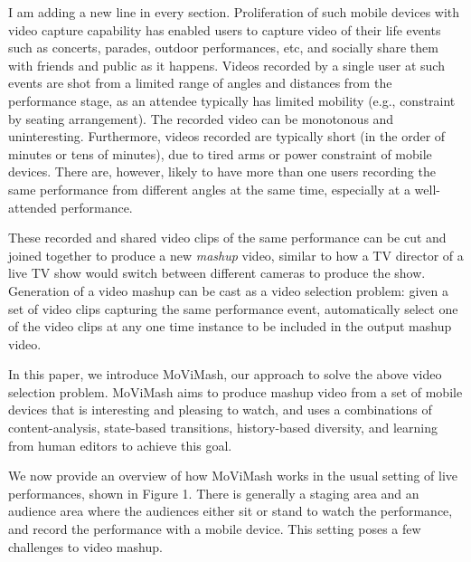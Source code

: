 \documentclass{new}
\begin{document}
I am adding a new line in every section.
Proliferation of such mobile devices with video capture capability
has enabled users to capture video of their life events such
as concerts, parades, outdoor performances, etc, and socially share
them with friends and public as it happens. Videos recorded by
a single user at such events are shot from a limited range of angles
and distances from the performance stage, as an attendee typically
has limited mobility (e.g., constraint by seating arrangement).
The recorded video can be monotonous and uninteresting. Furthermore,
videos recorded are typically short (in the order of minutes
or tens of minutes), due to tired arms or power constraint of mobile
devices. There are, however, likely to have more than one users
recording the same performance from different angles at the same
time, especially at a well-attended performance.

These recorded and shared video clips of the same performance
    can be cut and joined together to produce a new \textit{mashup} video,
similar to how a TV director of a live TV show would switch between
different cameras to produce the show. Generation of a video
mashup can be cast as a video selection problem: given a set of
video clips capturing the same performance event, automatically
select one of the video clips at any one time instance to be included
in the output mashup video.

In this paper, we introduce MoViMash, our approach to solve
the above video selection problem. MoViMash aims to produce
mashup video from a set of mobile devices that is interesting and
pleasing to watch, and uses a combinations of content-analysis,
state-based transitions, history-based diversity, and learning from
human editors to achieve this goal.

We now provide an overview of how MoViMash works in the
usual setting of live performances, shown in Figure 1. There is
generally a staging area and an audience area where the audiences
either sit or stand to watch the performance, and record the performance
with a mobile device. This setting poses a few challenges to
video mashup.
\end{document}
